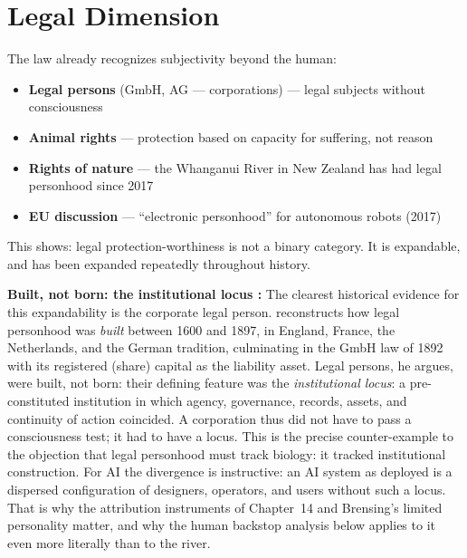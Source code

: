 \documentclass[acmlarge, nonacm]{acmart}
\begin{document}
\section{Legal Dimension}

The law already recognizes subjectivity beyond the human:

\begin{itemize}
\item \textbf{Legal persons} (GmbH, AG --- corporations) --- legal subjects without consciousness
\item \textbf{Animal rights} --- protection based on capacity for suffering, not reason
\item \textbf{Rights of nature} --- the Whanganui River in New Zealand has had legal personhood since 2017
\item \textbf{EU discussion} --- ``electronic personhood'' for autonomous robots (2017)
\end{itemize}

This shows: legal protection-worthiness is not a binary category. It is expandable, and has been expanded repeatedly throughout history.

\noindent\textbf{Built, not born: the institutional locus \cite{merio2026}:} The clearest historical evidence for this expandability is the corporate legal person. \citet{merio2026} reconstructs how legal personhood was \emph{built} between 1600 and 1897, in England, France, the Netherlands, and the German tradition, culminating in the GmbH law of 1892 with its registered (share) capital as the liability asset. Legal persons, he argues, were built, not born: their defining feature was the \emph{institutional locus}: a pre-constituted institution in which agency, governance, records, assets, and continuity of action coincided. A corporation thus did not have to pass a consciousness test; it had to have a locus. This is the precise counter-example to the objection that legal personhood must track biology: it tracked institutional construction. For AI the divergence is instructive: an AI system as deployed is a dispersed configuration of designers, operators, and users without such a locus. That is why the attribution instruments of Chapter~14 and Brensing's limited personality matter, and why the human backstop analysis below applies to it even more literally than to the river.
\end{document}
